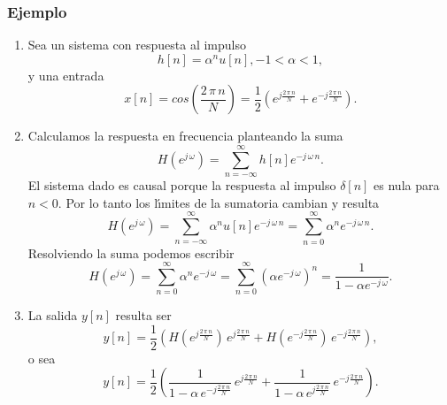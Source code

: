 \subsubsection{Ejemplo}

\begin{enumerate}

\item Sea un sistema con respuesta al impulso 
\begin{equation}
h\left[ n\right] =\alpha ^nu\left[ n\right] ,-1<\alpha <1,
\end{equation}
y una entrada 
\begin{equation}
x\left[ n\right] =
  cos\left( \frac{2 \, \pi \, n}{N}\right) =
  \frac{1}{2}\left( e^{j\frac{2 \, \pi \, n}{N}}+e^{-j\frac{2 \, \pi \, n}{N}}\right) .
\end{equation}

\item Calculamos la respuesta en frecuencia planteando la suma
\begin{equation}
  H\left( e^{j \, \omega }\right) =\sum_{n=-\infty }^{\infty }h\left[ n\right]e^{-j \, \omega \, n}.
\end{equation}
El sistema dado es causal porque la respuesta al impulso $\delta[n]$ es nula para $n < 0$. Por lo
tanto los l\'{\i}mites de la sumatoria cambian y resulta
\begin{equation}
H\left( e^{j \, \omega }\right) =
  \sum_{n=-\infty }^{\infty }\alpha ^nu\left[ n\right] e^{-j \, \omega \, n}=
  \sum_{n=0}^{\infty }\alpha ^ne^{-j \, \omega \, n}.
\end{equation}
Resolviendo la suma podemos escribir
\begin{equation}
H\left( e^{j \, \omega }\right) =
  \sum_{n=0}^{\infty }\alpha ^ne^{-j \, \omega}=
  \sum_{n=0}^{\infty }\left( \alpha e^{-j \, \omega }\right) ^n=
    \frac{1}{1-\alpha e^{-j \, \omega }}.
\end{equation}

\item La salida $y\left[ n\right] $ resulta ser 
\begin{equation}
y\left[ n\right] =
  \frac{1}{2} \left( 
     H\left( e^{j\frac{2 \, \pi \, n}{N}}\right) \, e^{j\frac{2 \, \pi \, n}{N}}+
     H\left( e^{-j\frac{2 \, \pi \, n}{N}}\right) \, e^{-j\frac{2 \, \pi \, n}{N}}\right) ,
\end{equation}
o sea 
\begin{equation}
y\left[ n\right] =
  \frac{1}{2}\left( 
     \frac{1}{1-\alpha \, e^{-j\frac{2 \, \pi \, n}{N}}} \, e^{j\frac{2 \, \pi \, n}{N}}+
     \frac{1}{1-\alpha \, e^{j\frac{2 \, \pi \, n}{N}}} \, e^{-j\frac{2 \, \pi \, n}{N}}
  \right) .
\end{equation}

\end{enumerate}

